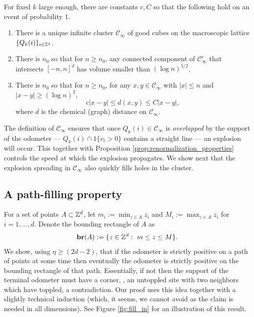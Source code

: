 \documentclass[12pt]{amsart}
\begin{document}
\begin{prop} \label{prop:renormalization_properties}
	For fixed $k$ large enough, there are constants $c, C$ so that the following hold
	on an event of probability 1. 
	\begin{enumerate}
		\item There is a unique infinite cluster $\mathcal{C}_{\infty}$ of good cubes
		on the macroscopic lattice $\{Q_k(i)\}_{i \in \mathbb{Z}^d}$. 
		\item	There is $n_0$ so that for $n \geq n_0$, any connected
		component of $\mathcal{C}_{\infty}^c$ that intersects $[-n,n]^d$ has volume 
		smaller than $(\log n)^{5/2}$.
		\item   There is $n_0$ so that for $n \geq n_0$, for any $x,y \in \mathcal{C}_{\infty}$ with $|x| \leq n$ and $|x-y| \geq (\log n)^2$, 
		\[
		c |x-y| \leq d(x,y) \leq C |x-y|,  
		\] 
		where $d$ is the chemical (graph) distance on $\mathcal{C}_{\infty}$.
	\end{enumerate}
\end{prop}

The definition of $\mathcal{C}_{\infty}$ ensures that once $Q_k(i) \in \mathcal{C}_{\infty}$ is {\it overlapped}
by the support of the odometer --- $Q_k(i) \cap 1 \{ v_t > 0 \}$ contains a straight line --- an explosion will occur. This together 
with Proposition \ref{prop:renormalization_properties} controls the speed at which the explosion propagates.
We show next that the explosion spreading in $\mathcal{C}_{\infty}$ also quickly fills holes in the cluster.




\subsection{A path-filling property}
For a set of points $A \subset \mathbb{Z}^d$, 
let $m_i := \min_{z \in A} z_i$ and $M_i := \max_{z \in A} z_i$ for $i = 1, \ldots, d$. 
Denote the bounding rectangle of $A$ as 
\begin{equation}
\mathbf{br}(A) := \{ z \in \mathbb{Z}^d  : \mbox{ $m \leq z \leq M$} \}.
\end{equation}
We show, using $\eta \geq (2 d - 2)$, that if the odometer is strictly positive
on a path of points at some time then eventually the odometer is strictly positive on the
bounding rectangle of that path. Essentially, if not then the support of the terminal odometer must have a corner, \ie, an untoppled site with two neighbors which have toppled, a contradiction. Our proof uses this idea together 
with a slightly technical induction (which, it seems, we cannot avoid as the claim is needed in all dimensions).
See Figure \ref{fig:fill_in} for an illustration of this result. 
\end{document}
